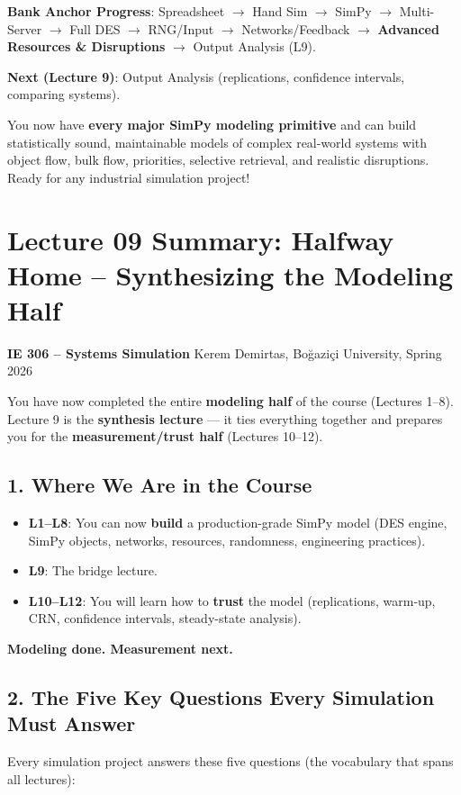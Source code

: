 \documentclass[11pt]{article}
\begin{document}
\textbf{Bank Anchor Progress}: Spreadsheet $\rightarrow$ Hand Sim $\rightarrow$ SimPy $\rightarrow$ Multi-Server $\rightarrow$ Full DES $\rightarrow$ RNG/Input $\rightarrow$ Networks/Feedback $\rightarrow$ \textbf{Advanced Resources \& Disruptions} $\rightarrow$ Output Analysis (L9).

\textbf{Next (Lecture 9)}: Output Analysis (replications, confidence intervals, comparing systems).

You now have \textbf{every major SimPy modeling primitive} and can build statistically sound, maintainable models of complex real-world systems with object flow, bulk flow, priorities, selective retrieval, and realistic disruptions. Ready for any industrial simulation project!

\section*{Lecture 09 Summary: Halfway Home -- Synthesizing the Modeling Half}
\textbf{IE 306 -- Systems Simulation}
Kerem Demirtas, Boğaziçi University, Spring 2026

You have now completed the entire \textbf{modeling half} of the course (Lectures 1--8).  
Lecture 9 is the \textbf{synthesis lecture} --- it ties everything together and prepares you for the \textbf{measurement/trust half} (Lectures 10--12).

\subsection*{1. Where We Are in the Course}
\begin{itemize}[leftmargin=*]
\item \textbf{L1--L8}: You can now \textbf{build} a production-grade SimPy model (DES engine, SimPy objects, networks, resources, randomness, engineering practices).  
\item \textbf{L9}: The bridge lecture.  
\item \textbf{L10--L12}: You will learn how to \textbf{trust} the model (replications, warm-up, CRN, confidence intervals, steady-state analysis).
\end{itemize}

\textbf{Modeling done. Measurement next.}

\subsection*{2. The Five Key Questions Every Simulation Must Answer}
Every simulation project answers these five questions (the vocabulary that spans all lectures):
\end{document}
